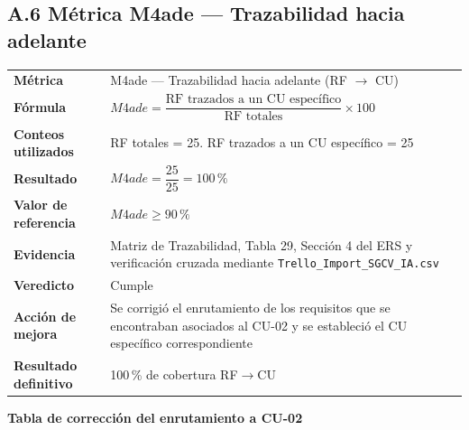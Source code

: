 \subsection*{A.6 Métrica M4ade — Trazabilidad hacia adelante}

\begin{tabular}{p{3.2cm}p{9.5cm}}
\hline
\textbf{Métrica} &
M4ade — Trazabilidad hacia adelante
(RF $\rightarrow$ CU) \\

\textbf{Fórmula} &
$M4ade =
\dfrac{\text{RF trazados a un CU específico}}
{\text{RF totales}}\times100$ \\

\textbf{Conteos utilizados} &
RF totales = 25. \newline
RF trazados a un CU específico = 25 \\

\textbf{Resultado} &
$M4ade=\dfrac{25}{25}=100\,\%$ \\

\textbf{Valor de referencia} & $M4ade\geq90\,\%$ \\

\textbf{Evidencia} &
Matriz de Trazabilidad, Tabla 29, Sección 4 del ERS y verificación
cruzada mediante \texttt{Trello\_Import\_SGCV\_IA.csv} \\

\textbf{Veredicto} & Cumple \\

\textbf{Acción de mejora} &
Se corrigió el enrutamiento de los requisitos que se encontraban
asociados al CU-02 y se estableció el CU específico correspondiente \\

\textbf{Resultado definitivo} &
100\,\% de cobertura RF$\rightarrow$CU \\

\hline
\end{tabular}

\vspace{0.3cm}

\noindent\textbf{Tabla de corrección del enrutamiento a CU-02}

